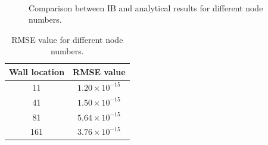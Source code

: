 \begin{figure}[H]
	\centering
	\quad
	\\
	\quad
	\caption{Comparison between IB and analytical results for different node numbers.}
	\label{fig:C3_indirectForcing_nodeNumber}
\end{figure}

\begin{table}[H]
\centering
\begin{tabular}{c | c}
	 Wall location & RMSE value \\ \hline \hline
	 11 & $1.20 \times 10^{-15}$ \\ \hline
	 41 & $1.50 \times 10^{-15}$ \\ \hline
	 81 & $5.64 \times 10^{-15}$ \\ \hline
	 161 & $3.76 \times 10^{-15}$
\end{tabular}
\caption{RMSE value for different node numbers.}
\label{table:C3_indirectForcing_nodeNumberRSME}
\end{table}

